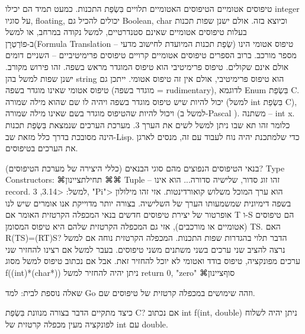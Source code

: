       טיפוסים אטומיים
      הטיפוסים האטומיים תלויים בִּשְׂפַת התכנות. כמעט תמיד הם יכילו integer על סוגיו, floating, יכולים להכיל גם Boolean, char וכיוצא בזה. אולם ישנן שפות תכנות בעלות טיפוסים אטומיים שאינם סטנדרטיים, למשל נקודה במרחב, או למשל ב-פוֹרְטְרָן(Formula Translation – שְׂפַת תכנות המיועדת לחישוב מדעי) טיפוס אטומי הינו מספר מורכב.
      ברוב הספרים טיפוסים אטומיים קרויים טיפוסים פרימיטיביים – השניים דומים אולם אינם שקולים. טיפוס פרימיטיבי הוא טיפוס המוגדר מראש בשפה. זהו פירוש מקורב. ישנן שפות למשל בהן string הוא טיפוס פרימיטיבי, אולם אין זה טיפוס אטומי. ייתכן גם טיפוס אטומי שאינו מוגדר בשפה (מוגדר בשפה = rudimentary), לדוגמא Enum בִּשְׂפַת C.
      יכול להיות שיש טיפוס מוגדר בשפה ויהיה לו שם שהוא מילה שמורה (למשל int בִּשְׂפַת C), ויכול להיות שהטיפוס מוגדר בשם שאינו מילה שמורה (למשל ב-Pascal ).
      משתנה – int x. כלומר זהו תא שבו ניתן למשל לשים את הערך 3.
      מערכת הערכים שנמצאת בִּשְׂפַת תכנות הינה מסובכת בדרך כלל מזאת שב-Lisp. כדי שלמתכנת יהיה נוח לעבוד עם זה, מנסים לארגן את הערכים בטיפוסים.

      בנאי הטיפוסים הנפוצים
      מהם סוגי הבנאים (כללי היצירה של מערכת הטיפוסים)? Type Constructors:
      ⌘תחילת{ציינון}
      ⌘⌘ Tuple – זהו זוג סדור, שלישיה סדורה... הוא אינו record.
      למשל: <3.14, 3, "Pi"> הוא ערך המוכל משלוש קואורדינטות. אזי זהו מילולון בשפה דימיונית שמשמעותו הערך של השלישיה.
      בצורה יותר מדוייקת אנו אומרים שיש לנו אופרטור של יצירת טיפוסים חדשים בנאי המכפלה הקרטזית האומר
      אם T ו-S הם טיפוסים (אטומיים או מורכבים), אזי גם המכפלה הקרטזית שלהם היא טיפוס המסומן TS.
      האם R(TS)=(RT)S? הדבר תלוי בהגדרות שפות התכנות. המכפלה הקרטזית נוחה אם למשל נרצה להציב שני ערכים בשני משתנים משני טיפוסים. בעבר למשל אם רצינו להחזיר שני ערכים מפונקציה, טיפוס בודד ואטומי לא יוכל להחזיר זאת. אבל אם נכתוב טיפוס למשל מסוג f((int)*(char*)){}
      ניתן יהיה להחזיר למשל return 0, "zero"
  ⌘סוף{ציינון}

      שאלה נוספת לבית: למד Go וזהה שימושים במכפלה קרטזית של טיפוסים שם.

      כיצד מתקיים הדבר בצורה מנוונת בִּשְׂפַת C?
      אם נכתוב int f(int, double) ניתן יהיה לשלוח לפונקציה מעין מכפלה קרטזית של int עם double.


